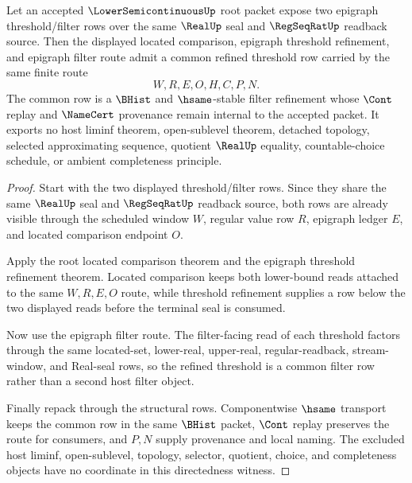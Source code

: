 \begin{theorem}
\label{thm:lowersemicontinuous-root-epigraph-filter-directedness}
Let an accepted $\LowerSemicontinuousUp$ root packet expose two epigraph threshold/filter rows over the same $\RealUp$ seal and $\RegSeqRatUp$ readback source. Then the displayed located comparison, epigraph threshold refinement, and epigraph filter route admit a common refined threshold row carried by the same finite route
$$
W,R,E,O,H,C,P,N .
$$
The common row is a $\BHist$ and $\hsame$-stable filter refinement whose $\Cont$ replay and $\NameCert$ provenance remain internal to the accepted packet. It exports no host liminf theorem, open-sublevel theorem, detached topology, selected approximating sequence, quotient $\RealUp$ equality, countable-choice schedule, or ambient completeness principle.
\end{theorem}
\begin{proof}
Start with the two displayed threshold/filter rows. Since they share the same $\RealUp$ seal and $\RegSeqRatUp$ readback source, both rows are already visible through the scheduled window $W$, regular value row $R$, epigraph ledger $E$, and located comparison endpoint $O$.

Apply the root located comparison theorem and the epigraph threshold refinement theorem. Located comparison keeps both lower-bound reads attached to the same $W,R,E,O$ route, while threshold refinement supplies a row below the two displayed reads before the terminal seal is consumed.

Now use the epigraph filter route. The filter-facing read of each threshold factors through the same located-set, lower-real, upper-real, regular-readback, stream-window, and Real-seal rows, so the refined threshold is a common filter row rather than a second host filter object.

Finally repack through the structural rows. Componentwise $\hsame$ transport keeps the common row in the same $\BHist$ packet, $\Cont$ replay preserves the route for consumers, and $P,N$ supply provenance and local naming. The excluded host liminf, open-sublevel, topology, selector, quotient, choice, and completeness objects have no coordinate in this directedness witness.
\end{proof}

